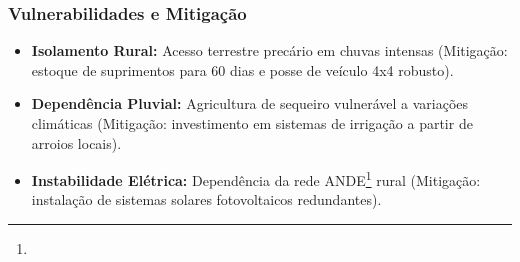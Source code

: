 \subsubsection{Vulnerabilidades e
Mitigação}

\begin{itemize}
\tightlist
\item
  \textbf{Isolamento Rural:} Acesso terrestre precário em chuvas
  intensas (Mitigação: estoque de suprimentos para 60 dias e posse de
  veículo 4x4 robusto).
\item
  \textbf{Dependência Pluvial:} Agricultura de sequeiro vulnerável a
  variações climáticas (Mitigação: investimento em sistemas de irrigação
  a partir de arroios locais).
\item
  \textbf{Instabilidade Elétrica:} Dependência da rede ANDE\footnote{\fineANDE} rural
  (Mitigação: instalação de sistemas solares fotovoltaicos redundantes).
\end{itemize}

